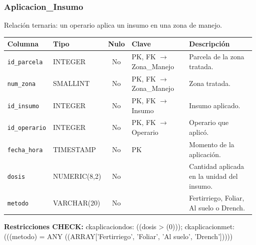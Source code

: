 \documentclass[11pt,letterpaper]{article}
\newcommand{\tbus}{\textunderscore\allowbreak}
\newcommand{\tb}[1]{{\ttfamily\let\_\tbus #1}}
\begin{document}
\subsubsection*{Aplicacion\_Insumo}
Relación ternaria: un operario aplica un insumo en una zona de manejo.
{\footnotesize
\begin{longtable}{>{\raggedright\arraybackslash}p{3.3cm}>{\raggedright\arraybackslash}p{2.5cm}c>{\raggedright\arraybackslash}p{2.2cm}>{\raggedright\arraybackslash}p{6.1cm}}
\toprule
\textbf{Columna} & \textbf{Tipo} & \textbf{Nulo} & \textbf{Clave} & \textbf{Descripción} \\
\midrule
\endhead
\texttt{id\_parcela} & INTEGER & No & PK, FK $\to$ Zona\_Manejo & Parcela de la zona tratada. \\
\texttt{num\_zona} & SMALLINT & No & PK, FK $\to$ Zona\_Manejo & Zona tratada. \\
\texttt{id\_insumo} & INTEGER & No & PK, FK $\to$ Insumo & Insumo aplicado. \\
\texttt{id\_operario} & INTEGER & No & PK, FK $\to$ Operario & Operario que aplicó. \\
\texttt{fecha\_hora} & TIMESTAMP & No & PK & Momento de la aplicación. \\
\texttt{dosis} & NUMERIC(8,2) & No &  & Cantidad aplicada en la unidad del insumo. \\
\texttt{metodo} & VARCHAR(20) & No &  & Fertirriego, Foliar, Al suelo o Drench. \\
\bottomrule
\end{longtable}}
{\footnotesize\textbf{Restricciones CHECK:} \tb{ck\_aplicacion\_dos}: \tb{((dosis > (0)))}; \tb{ck\_aplicacion\_met}: \tb{(((metodo) = ANY ((ARRAY['Fertirriego', 'Foliar', 'Al suelo', 'Drench']))))}\par}
\medskip
\end{document}
